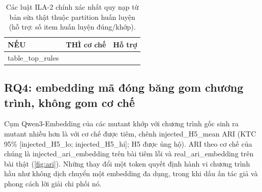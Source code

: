 \begin{table}[t]
\centering
\caption{Các luật ILA-2 chính xác nhất quy nạp từ bản sửa thật thuộc partition huấn luyện (hỗ trợ: số item huấn luyện đúng/khớp).}\label{tab:toprules}
\small
\begin{tabular}{p{7.6cm}p{3.0cm}r}
\toprule
NẾU & THÌ cơ chế & Hỗ trợ \\
\midrule
{{table_top_rules}}
\bottomrule
\end{tabular}
\end{table}

\subsection{RQ4: embedding mã đóng băng gom chương trình, không gom cơ chế}
Cụm Qwen3-Embedding của các mutant khớp với chương trình gốc sinh ra mutant nhiều hơn là với cơ chế được tiêm, chênh {{injected_H5_mean}} ARI (KTC 95\% [{{injected_H5_lo}}; {{injected_H5_hi}}]; H5 được ủng hộ). ARI theo cơ chế của chúng là {{injected_ari_embedding}} trên bài tiêm lỗi và {{real_ari_embedding}} trên bài thật (\cref{fig:ari}). Những thay đổi một token quyết định hành vi chương trình hầu như không dịch chuyển một embedding đa dụng, trong khi dấu ấn tác giả và phong cách lời giải chi phối nó.
